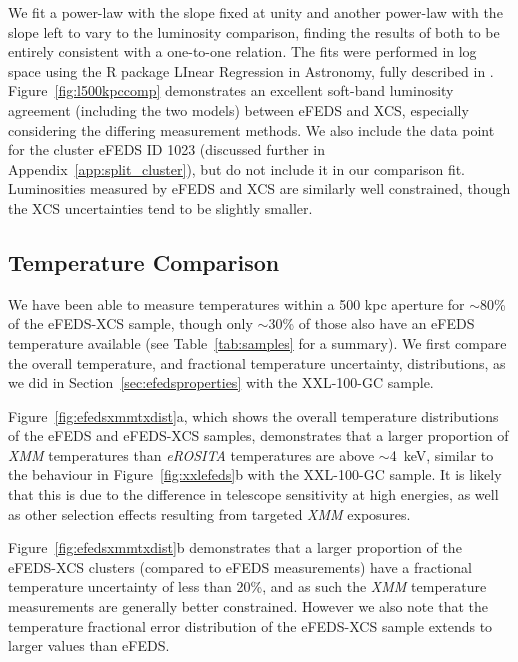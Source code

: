 \documentclass[fleqn,usenatbib]{mnras}
\begin{document}
We fit a power-law with the slope fixed at unity and another power-law with the slope left to vary to the luminosity comparison, finding the results of both to be entirely consistent with a one-to-one relation. The fits were performed in log space using the R package LInear Regression in Astronomy\citep[{\sc lira}\footnote{\href{https://cran.r-project.org/web/packages/lira/index.html}{LInear Regression in Astronomy}}, ][]{softlira}, fully described in \cite{LIRA}. Figure~\ref{fig:l500kpccomp} demonstrates an excellent soft-band luminosity agreement (including the two models) between eFEDS and XCS, especially considering the differing measurement methods. We also include the data point for the cluster eFEDS ID 1023 (discussed further in Appendix~\ref{app:split_cluster}), but do not include it in our comparison fit. Luminosities measured by eFEDS and XCS are similarly well constrained, though the XCS uncertainties tend to be slightly smaller.

\subsection{Temperature Comparison}
\label{subsec:tcomp}

We have been able to measure temperatures within a 500 kpc aperture for ${\sim}$80\% of the eFEDS-XCS sample, though only ${\sim}$30\% of those also have an eFEDS temperature available (see Table~\ref{tab:samples} for a summary). We first compare the overall temperature, and fractional temperature uncertainty, distributions, as we did in Section~\ref{sec:efedsproperties} with the XXL-100-GC sample.

Figure~\ref{fig:efedsxmmtxdist}a, which shows the overall temperature distributions of the eFEDS and eFEDS-XCS samples, demonstrates that a larger proportion of {\em XMM} temperatures than {\em eROSITA} temperatures are above ${\sim}$4~keV, similar to the behaviour in Figure~\ref{fig:xxlefeds}b with the XXL-100-GC sample. It is likely that this is due to the difference in telescope sensitivity at high energies, as well as other selection effects resulting from targeted {\em XMM} exposures. 

Figure~\ref{fig:efedsxmmtxdist}b demonstrates that a larger proportion of the eFEDS-XCS clusters (compared to eFEDS measurements) have a fractional temperature uncertainty of less than 20\%, and as such the {\em XMM} temperature measurements are generally better constrained. However we also note that the temperature fractional error distribution of the eFEDS-XCS sample extends to larger values than eFEDS. 
\end{document}

